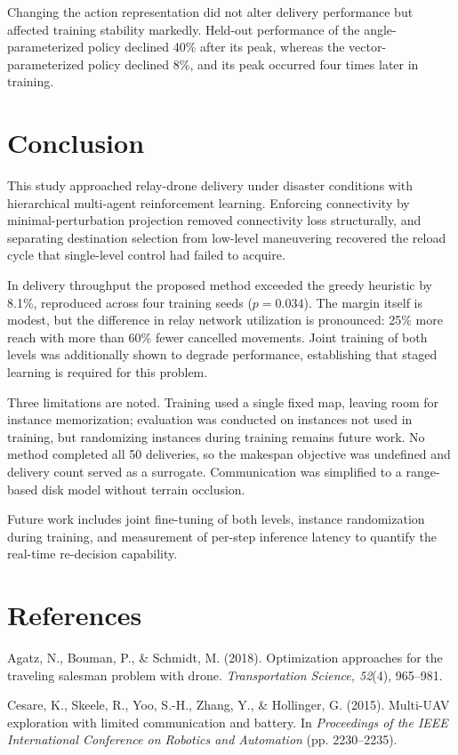 \documentclass[12pt]{article}
\begin{document}
Changing the action representation did not alter delivery performance but affected training
stability markedly. Held-out performance of the angle-parameterized policy declined 40\% after its
peak, whereas the vector-parameterized policy declined 8\%, and its peak occurred four times later
in training.

\section{Conclusion}

This study approached relay-drone delivery under disaster conditions with hierarchical multi-agent
reinforcement learning. Enforcing connectivity by minimal-perturbation projection removed
connectivity loss structurally, and separating destination selection from low-level maneuvering
recovered the reload cycle that single-level control had failed to acquire.

In delivery throughput the proposed method exceeded the greedy heuristic by 8.1\%, reproduced
across four training seeds ($p=0.034$). The margin itself is modest, but the difference in relay
network utilization is pronounced: 25\% more reach with more than 60\% fewer cancelled movements.
Joint training of both levels was additionally shown to degrade performance, establishing that
staged learning is required for this problem.

Three limitations are noted. Training used a single fixed map, leaving room for instance
memorization; evaluation was conducted on instances not used in training, but randomizing instances
during training remains future work. No method completed all 50 deliveries, so the makespan
objective was undefined and delivery count served as a surrogate. Communication was simplified to a
range-based disk model without terrain occlusion.

Future work includes joint fine-tuning of both levels, instance randomization during training, and
measurement of per-step inference latency to quantify the real-time re-decision capability.

\section*{References}

\noindent Agatz, N., Bouman, P., \& Schmidt, M. (2018). Optimization approaches for the traveling
salesman problem with drone. \textit{Transportation Science, 52}(4), 965--981.

\noindent Cesare, K., Skeele, R., Yoo, S.-H., Zhang, Y., \& Hollinger, G. (2015). Multi-UAV
exploration with limited communication and battery. In \textit{Proceedings of the IEEE
International Conference on Robotics and Automation} (pp. 2230--2235).
\end{document}
